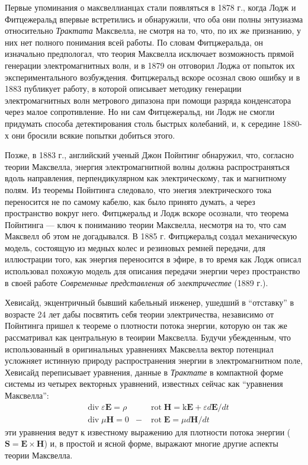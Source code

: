 \documentclass[12pt, oneside, a4paper]{article}
\begin{document}
Первые упоминания о максвеллианцах стали появляться в 1878 г., когда Лодж и Фитцежеральд впервые встретились и обнаружили, что оба они полны энтузиазма относительно \emph{Трактата} Максвелла, не смотря на то, что, по их же признанию, у них нет полного понимания всей работы. По словам Фитцжеральда, он изначально предпологал, что теория Максвелла исключает возможность прямой генерации электромагнитных волн, и в 1879 он отговорил Лоджа от попыток их экспериментального возбуждения. Фитцжеральд вскоре осознал свою ошибку и в 1883 публикует работу, в которой описывает методику генерации электромагнитных волн метрового дипазона при помощи разряда конденсатора через малое сопротивление. Но ни сам Фитцежеральд, ни Лодж не смогли придумать способа детектирования столь быстрых колебаний, и, к середине 1880-х они бросили всякие попытки добиться этого.

Позже, в 1883 г., английский ученый Джон Пойнтинг обнаружил, что, согласно теории Максвелла, энергия электромагнитной волны должна распространяться вдоль направления, перпендикулярном как электрическому, так и магнитному полям. Из теоремы Пойнтинга следовало, что энегия электрического тока переносится не по самому кабелю, как было принято думать, а через пространство вокруг него. Фитцжеральд и Лодж вскоре осознали, что теорема Пойнтинга --- ключ к пониманию теории Максвелла, несмотря на то, что сам Максвелл об этом не догадывался. В 1885 г. Фитцжеральд создал механическую модель, состоящую из медных колес и резиновых ремней передачи, для иллюстрации того, как энергия переносится в эфире, в то время как Лодж описал использовал похожую модель для описания передачи энергии через пространство в своей работе \emph{Современные представления об электричестве} (1889 г.).

Хевисайд, экцентричный бывший кабельный инженер, ушедший в ``отставку'' в возрасте 24 лет дабы посвятить себя теории электричества, независимо от Пойнтинга пришел к теореме о плотности потока энергии, которую он так же рассматривал как центральную в теоирии Максвелла. Будучи убежденным, что использованный в оригинальных уравнениях Максвелла вектор потенциал усложняет истинную природу распространения энергии в электромагнитном поле, Хевисайд переписывает уравнения, данные в \emph{Трактате} в компактной форме системы из четырех векторных уравнений, известных сейчас как ``уравнения Максвелла'':
\begin{align*}
&\operatorname{div}\varepsilon{}\mathbf{E} = \rho& 
&\operatorname{rot}\mathbf{H}=\mathrm{k}\mathbf{E} + \varepsilon{}d\mathbf{E}/dt\\
&\operatorname{div}\mu{}\mathbf{H}=0& 
-&\operatorname{rot}\mathbf{E}=\mu{}d\mathbf{H}/dt
\end{align*}
эти уравнения ведут к известному выражению для плотности потока энергии ($\mathbf{S}=\mathbf{E}\times\mathbf{H}$) и, в простой и ясной форме, выражают многие другие аспекты теории Максвелла.
\end{document}
